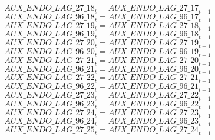 \begin{dmath}
{AUX\_ENDO\_LAG\_27\_18}_{t}={AUX\_ENDO\_LAG\_27\_17}_{t-1}
\end{dmath}
\begin{dmath}
{AUX\_ENDO\_LAG\_96\_18}_{t}={AUX\_ENDO\_LAG\_96\_17}_{t-1}
\end{dmath}
\begin{dmath}
{AUX\_ENDO\_LAG\_27\_19}_{t}={AUX\_ENDO\_LAG\_27\_18}_{t-1}
\end{dmath}
\begin{dmath}
{AUX\_ENDO\_LAG\_96\_19}_{t}={AUX\_ENDO\_LAG\_96\_18}_{t-1}
\end{dmath}
\begin{dmath}
{AUX\_ENDO\_LAG\_27\_20}_{t}={AUX\_ENDO\_LAG\_27\_19}_{t-1}
\end{dmath}
\begin{dmath}
{AUX\_ENDO\_LAG\_96\_20}_{t}={AUX\_ENDO\_LAG\_96\_19}_{t-1}
\end{dmath}
\begin{dmath}
{AUX\_ENDO\_LAG\_27\_21}_{t}={AUX\_ENDO\_LAG\_27\_20}_{t-1}
\end{dmath}
\begin{dmath}
{AUX\_ENDO\_LAG\_96\_21}_{t}={AUX\_ENDO\_LAG\_96\_20}_{t-1}
\end{dmath}
\begin{dmath}
{AUX\_ENDO\_LAG\_27\_22}_{t}={AUX\_ENDO\_LAG\_27\_21}_{t-1}
\end{dmath}
\begin{dmath}
{AUX\_ENDO\_LAG\_96\_22}_{t}={AUX\_ENDO\_LAG\_96\_21}_{t-1}
\end{dmath}
\begin{dmath}
{AUX\_ENDO\_LAG\_27\_23}_{t}={AUX\_ENDO\_LAG\_27\_22}_{t-1}
\end{dmath}
\begin{dmath}
{AUX\_ENDO\_LAG\_96\_23}_{t}={AUX\_ENDO\_LAG\_96\_22}_{t-1}
\end{dmath}
\begin{dmath}
{AUX\_ENDO\_LAG\_27\_24}_{t}={AUX\_ENDO\_LAG\_27\_23}_{t-1}
\end{dmath}
\begin{dmath}
{AUX\_ENDO\_LAG\_96\_24}_{t}={AUX\_ENDO\_LAG\_96\_23}_{t-1}
\end{dmath}
\begin{dmath}
{AUX\_ENDO\_LAG\_27\_25}_{t}={AUX\_ENDO\_LAG\_27\_24}_{t-1}
\end{dmath}
